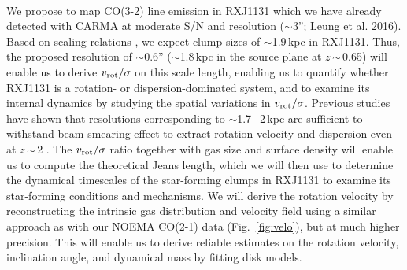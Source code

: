 \documentclass[11pt,a4paper,twoside,graphicx,color]{article}
\newcommand{\vs}{$v_{\rm rot}/\sigma$\xspace}
\newcommand{\bco}{\mbox{CO(2-1)}\xspace}
\newcommand{\cco}{\mbox{CO(3-2)}\xspace}
\newcommand{\Fig}[1]{Fig.~\ref{fig:#1}}
\newcommand{\ssim}{\,$\sim$\,}
\newcommand{\highz}{high-$z$\xspace}
\begin{document}
\vspace{0.2em}
 \\
\indent
We propose to map \cco line emission in RXJ1131
which we have already detected with CARMA at moderate S/N and resolution ($\sim$3''; Leung et al. 2016).
Based on scaling relations
\citep{Genzel11a}, %
we expect clump sizes of %
$\sim$1.9\,kpc in RXJ1131. %
Thus, the proposed resolution of $\sim$0.6'' ($\sim$1.8\,kpc in the source plane at $z$\ssim0.65) will enable us to derive \vs
on this scale length, enabling us to quantify whether RXJ1131 is a rotation- or dispersion-dominated system,
and to examine its internal dynamics by studying the spatial variations in \vs.
Previous studies have shown that resolutions corresponding to $\sim$1.7$-$2\,kpc are sufficient to withstand %
beam smearing effect to extract rotation velocity and
dispersion even at $z$\ssim2  \citep[e.g.][]{Newman13a, Genzel14a}.
The \vs ratio together with gas size and surface density will enable us to compute the theoretical Jeans length,
which we will then use to determine the dynamical timescales of the star-forming clumps in RXJ1131
to examine its star-forming conditions and mechanisms.
%
We will derive the rotation velocity by reconstructing the intrinsic gas distribution and velocity field using
a similar approach as with our NOEMA \bco data (\Fig{velo}), but at much higher precision.
This will enable us to derive reliable estimates on the rotation velocity, inclination angle, and
dynamical mass by fitting disk models.
\end{document}
